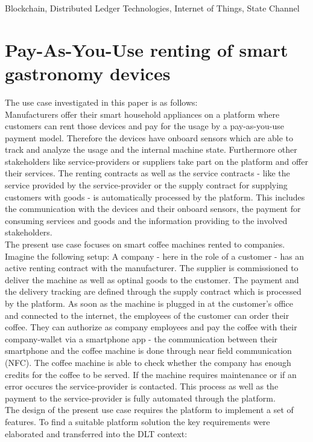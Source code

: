 \documentclass[conference]{IEEEtran}
\begin{document}
\begin{IEEEkeywords}
Blockchain, Distributed Ledger Technologies, Internet of Things, State Channel
\end{IEEEkeywords}


\section{Pay-As-You-Use renting of smart gastronomy devices}
The use case investigated in this paper is as follows:\\
Manufacturers offer their smart household appliances on a platform where customers can rent those devices and pay for the usage by a pay-as-you-use payment model. Therefore the devices have onboard sensors which are able to track and analyze the usage and the internal machine state. Furthermore other stakeholders like service-providers or suppliers take part on the platform and offer their services. The renting contracts as well as the service contracts - like the service provided by the service-provider or the supply contract for supplying customers with goods - is automatically processed by the platform. This includes the communication with the devices and their onboard sensors, the payment for consuming services and goods and the information providing to the involved stakeholders.\\
The present use case focuses on smart coffee machines rented to companies. Imagine the following setup: A company - here in the role of a customer - has an active renting contract with the manufacturer. The supplier is commissioned to deliver the machine as well as optinal goods to the customer. The payment and the delivery tracking are defined through the supply contract which is processed by the platform. As soon as the machine is plugged in at the customer's office and connected to the internet, the employees of the customer can order their coffee. They can authorize as company employees and pay the coffee with their company-wallet via a smartphone app - the communication between their smartphone and the coffee machine is done through near field communication (NFC). The coffee machine is able to check whether the company has enough credits for the coffee to be served. If the machine requires maintenance or if an error occures the service-provider is contacted. This process as well as the payment to the service-provider is fully automated through the platform. \\
The design of the present use case requires the platform to implement a set of features. To find a suitable platform solution the key requirements were elaborated and transferred into the DLT context:\\
\end{document}
